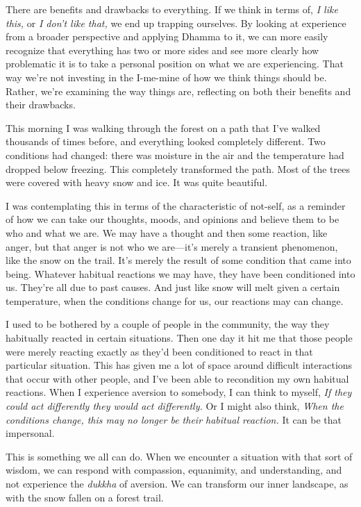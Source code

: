 There are benefits and drawbacks to everything. If we think in terms 
of, \emph{I like this,} or \emph{I don't like that,} we end up trapping 
ourselves. By looking at experience from a broader perspective and 
applying Dhamma to it, we can more easily recognize that everything has 
two or more sides and see more clearly how problematic it is to take a 
personal position on what we are experiencing. That way we're not 
investing in the I-me-mine of how we think things should be. Rather, 
we're examining the way things are, reflecting on both their benefits 
and their drawbacks.


This morning I was walking through the forest on a path that I've 
walked thousands of times before, and everything looked completely 
different. Two conditions had changed: there was moisture in the air 
and the temperature had dropped below freezing. This completely 
transformed the path. Most of the trees were covered with heavy snow 
and ice. It was quite beautiful.

I was contemplating this in terms of the characteristic of not-self, as 
a reminder of how we can take our thoughts, moods, and opinions and 
believe them to be who and what we are. We may have a thought and then 
some reaction, like anger, but that anger is not who we are---it's 
merely a transient phenomenon, like the snow on the trail. It's merely 
the result of some condition that came into being. Whatever habitual 
reactions we may have, they have been conditioned into us. They're all 
due to past causes. And just like snow will melt given a certain 
temperature, when the conditions change for us, our reactions may can 
change.

I used to be bothered by a couple of people in the community, the way 
they habitually reacted in certain situations. Then one day it hit me 
that those people were merely reacting exactly as they'd been 
conditioned to react in that particular situation. This has given me a 
lot of space around difficult interactions that occur with other 
people, and I've been able to recondition my own habitual reactions. 
When I experience aversion to somebody, I can think to myself, \emph{If 
they could act differently they would act differently.} Or I might also 
think, \emph{When the conditions change, this may no longer be their 
habitual reaction.} It can be that impersonal.

This is something we all can do. When we encounter a situation with 
that sort of wisdom, we can respond with compassion, equanimity, and 
understanding, and not experience the \emph{dukkha} of aversion. We can 
transform our inner landscape, as with the snow fallen on a forest 
trail.

